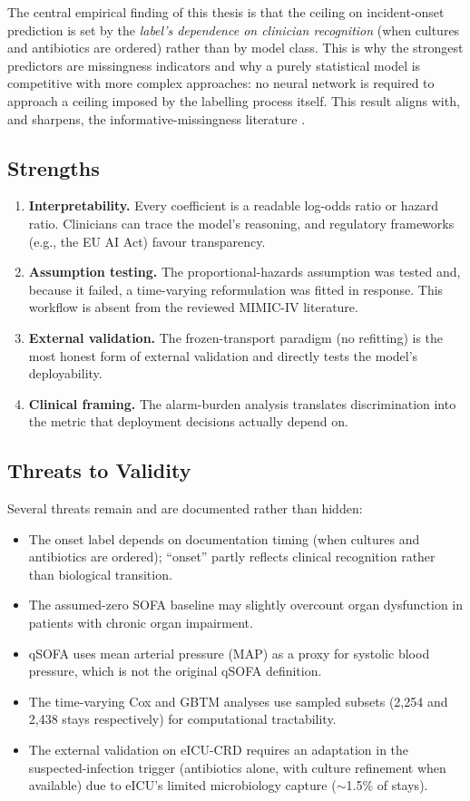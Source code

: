The central empirical finding of this thesis is that the ceiling on
incident-onset prediction is set by the \emph{label's dependence on clinician
recognition} (when cultures and antibiotics are ordered) rather than by model
class. This is why the strongest predictors are missingness indicators and why
a purely statistical model is competitive with more complex approaches: no
neural network is required to approach a ceiling imposed by the labelling
process itself. This result aligns with, and sharpens, the
informative-missingness literature
\cite{groenwold2020missingness,singh2021missingness}.

\subsection{Strengths}

\begin{enumerate}
  \item \textbf{Interpretability.} Every coefficient is a readable log-odds
  ratio or hazard ratio. Clinicians can trace the model's reasoning, and
  regulatory frameworks (e.g., the EU AI Act) favour transparency.
  \item \textbf{Assumption testing.} The proportional-hazards assumption was
  tested and, because it failed, a time-varying reformulation was fitted in
  response. This workflow is absent from the reviewed MIMIC-IV literature.
  \item \textbf{External validation.} The frozen-transport paradigm (no
  refitting) is the most honest form of external validation and directly
  tests the model's deployability.
  \item \textbf{Clinical framing.} The alarm-burden analysis translates
  discrimination into the metric that deployment decisions actually depend
  on.
\end{enumerate}

\subsection{Threats to Validity}

Several threats remain and are documented rather than hidden:
\begin{itemize}
  \item The onset label depends on documentation timing (when cultures and
  antibiotics are ordered); ``onset'' partly reflects clinical recognition
  rather than biological transition.
  \item The assumed-zero SOFA baseline may slightly overcount organ dysfunction
  in patients with chronic organ impairment.
  \item qSOFA uses mean arterial pressure (MAP) as a proxy for systolic blood
  pressure, which is not the original qSOFA definition.
  \item The time-varying Cox and GBTM analyses use sampled subsets (2{,}254 and
  2{,}438 stays respectively) for computational tractability.
  \item The external validation on eICU-CRD requires an adaptation in the
  suspected-infection trigger (antibiotics alone, with culture refinement when
  available) due to eICU's limited microbiology capture ($\sim$1.5\% of stays).
\end{itemize}
